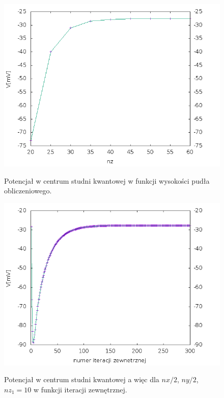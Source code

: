 \documentclass[11pt]{article}
\begin{document}
\begin{figure}[h]
\begin{center}
\includegraphics[scale=0.66]{nz.png}
\caption{Potencjał w centrum studni kwantowej w funkcji wysokości pudła obliczeniowego.}{\label{w_nz}}
\end{center}
\end{figure}
\begin{figure}[h]
\begin{center}
\includegraphics[scale=0.66]{numer.png}
\caption{Potencjał w centrum studni kwantowej a więc dla $nx/2$, $ny/2$, $nz_1=10$ w funkcji iteracji
zewnętrznej.}{\label{w_N}}
\end{center}
\end{figure}
\end{document}
